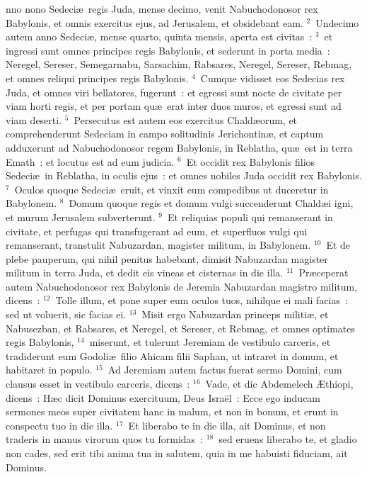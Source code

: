 \bchapter
{}nno nono Sedeci\ae\ regis Juda, mense decimo, venit Nabuchodonosor rex Babylonis, et omnis exercitus ejus, ad Jerusalem, et obsidebant eam.
${}^{2}$~Undecimo autem anno Sedeci\ae , mense quarto, quinta mensis, aperta est civitas~:
${}^{3}$~et ingressi sunt omnes principes regis Babylonis, et sederunt in porta media~: Neregel, Sereser, Semegarnabu, Sarsachim, Rabsares, Neregel, Sereser, Rebmag, et omnes reliqui principes regis Babylonis.
${}^{4}$~Cumque vidisset eos Sedecias rex Juda, et omnes viri bellatores, fugerunt~: et egressi sunt nocte de civitate per viam horti regis, et per portam qu\ae\ erat inter duos muros, et egressi sunt ad viam deserti.
${}^{5}$~Persecutus est autem eos exercitus Chald\ae orum, et comprehenderunt Sedeciam in campo solitudinis Jerichontin\ae , et captum adduxerunt ad Nabuchodonosor regem Babylonis, in Reblatha, qu\ae\ est in terra Emath~: et locutus est ad eum judicia.
${}^{6}$~Et occidit rex Babylonis filios Sedeci\ae\ in Reblatha, in oculis ejus~: et omnes nobiles Juda occidit rex Babylonis.
${}^{7}$~Oculos quoque Sedeci\ae\ eruit, et vinxit eum compedibus ut duceretur in Babylonem.
${}^{8}$~Domum quoque regis et domum vulgi succenderunt Chald\ae i igni, et murum Jerusalem subverterunt.
${}^{9}$~Et reliquias populi qui remanserant in civitate, et perfugas qui transfugerant ad eum, et superfluos vulgi qui remanserant, transtulit Nabuzardan, magister militum, in Babylonem.
${}^{10}$~Et de plebe pauperum, qui nihil penitus habebant, dimisit Nabuzardan magister militum in terra Juda, et dedit eis vineas et cisternas in die illa.
${}^{11}$~Pr\ae ceperat autem Nabuchodonosor rex Babylonis de Jeremia Nabuzardan magistro militum, dicens~:
${}^{12}$~Tolle illum, et pone super eum oculos tuos, nihilque ei mali facias~: sed ut voluerit, sic facias ei.
${}^{13}$~Misit ergo Nabuzardan princeps militi\ae , et Nabusezban, et Rabsares, et Neregel, et Sereser, et Rebmag, et omnes optimates regis Babylonis,
${}^{14}$~miserunt, et tulerunt Jeremiam de vestibulo carceris, et tradiderunt eum Godoli\ae\ filio Ahicam filii Saphan, ut intraret in domum, et habitaret in populo.
${}^{15}$~Ad Jeremiam autem factus fuerat sermo Domini, cum clausus esset in vestibulo carceris, dicens~:
${}^{16}$~Vade, et dic Abdemelech \AE thiopi, dicens~: H\ae c dicit Dominus exercituum, Deus Isra\"el~: Ecce ego inducam sermones meos super civitatem hanc in malum, et non in bonum, et erunt in conspectu tuo in die illa.
${}^{17}$~Et liberabo te in die illa, ait Dominus, et non traderis in manus virorum quos tu formidas~:
${}^{18}$~sed eruens liberabo te, et gladio non cades, sed erit tibi anima tua in salutem, quia in me habuisti fiduciam, ait Dominus.

